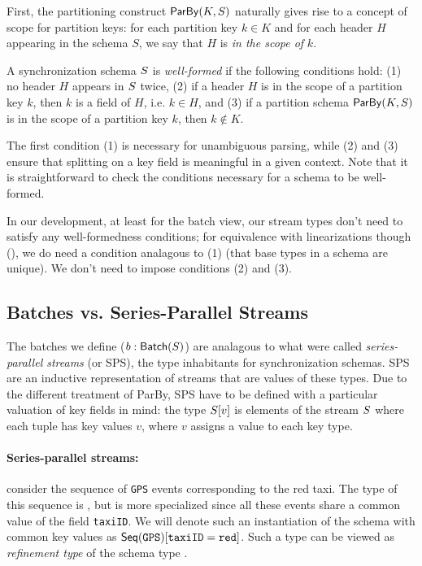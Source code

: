 \begin{definition}
\label{45:def:well-formed-sync-schema}
First, the partitioning construct $\keyby{K}{S}$ naturally gives rise to a concept of
scope for partition keys: for each partition key $k \in K$ and for each
header $H$ appearing in the schema $S$,
we say that $H$ is \emph{in the scope of} $k$.

A synchronization schema $\ss$ is \emph{well-formed} if the following conditions hold: (1) no header $H$ appears in $\ss$ twice,
    (2) if a header $H$ is in the scope of a partition key $k$, then $k$ is a field of $H$, i.e. $k \in H$, and
    (3) if a partition schema $\keyby{K}{S}$ is in the scope of a partition key $k$, then $k \not \in K$.
\end{definition}

The first condition (1) is necessary for unambiguous parsing, while (2) and (3)
ensure that splitting on a key field is meaningful in a given context.
Note that it is straightforward to check the conditions necessary for a schema to be well-formed.

In our development, at least for the batch view, our stream types don't need to satisfy any well-formedness conditions; for equivalence with linearizations though (), we do need a condition analagous to (1) (that base types in a schema are unique). We don't need to impose conditions (2) and (3).

\subsection{Batches vs. Series-Parallel Streams}

The batches we define ($\batchtype{b}{S}$) are analagous to what were called
\emph{series-parallel streams} (or SPS), the type inhabitants for synchronization schemas.
SPS are an inductive representation of streams that are values of these types.
Due to the different treatment of ParBy,
SPS have to be defined with a particular valuation of key fields in mind: the type $\spstype{v}{\ss}$ is elements of the stream $\ss$ where each tuple has key values $v$, where $v$ assigns a value to each key type.

\paragraph{Series-parallel streams:} consider the sequence of \texttt{GPS} events corresponding
to the red taxi. The type of this sequence is , but is more specialized
since all these events share a common value of the field \texttt{taxiID}.
We will denote such an instantiation of the schema with common key values
as $\spstype{\texttt{taxiID}=\texttt{red}}{\seqleaf{\texttt{GPS}}}$. Such a type can
be viewed as {\em refinement type} of the schema type .

